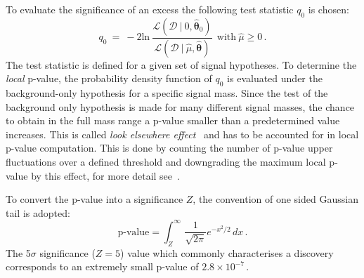 To evaluate the significance of an excess the following  test statistic $q_0$ is chosen:
\begin{equation}
q_0 ~ = ~  -2 \text{ln} ~ \frac{\mathcal{L}(\mathcal{D}~|~0, \hat{\boldsymbol{\theta}}_{0})}{\mathcal{L}(\mathcal{D} ~| ~ \hat{\mu}, \hat{\boldsymbol{\theta}})}
 ~ ~ \text{with} ~  \hat{\mu} \ge 0\,.
\end{equation}
The test statistic is defined for a given set of signal hypotheses. To determine the \emph{local} p-value,
the probability density function of $q_0$ is evaluated under the background-only hypothesis for a specific signal mass.  
Since the test of the background only hypothesis is made for many different signal masses, the chance to obtain in the full
mass range a p-value smaller than a predetermined value increases. This is called \emph{look elsewhere effect}~\cite{LEE}
and has to be accounted for in local p-value computation. This is done by counting the number of p-value upper fluctuations over
a defined threshold and downgrading the maximum local p-value by this effect, for more detail see~\cite{lhclimits,LEE}.

To convert the p-value into a significance $Z$, the convention of one sided Gaussian tail is adopted:
\begin{equation}
\text{p-value} = \int_Z^\infty \, \frac{1}{\sqrt{2\pi}} e^{-x^2/2} \, dx \,.
\end{equation}
The 5$\sigma$ significance ($Z = 5$) value which  commonly characterises a discovery corresponds to an 
extremely  small p-value of $2.8 \times 10^{-7}\,.$


